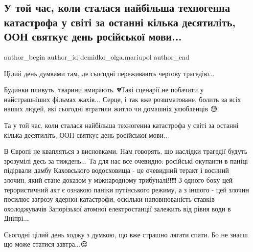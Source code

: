  
 
 
 
 

\subsection{У той час, коли сталася найбільша техногенна катастрофа у світі за останні кілька десятиліть, ООН святкує день російської мови...}
\label{sec:06_06_2023.fb.demidko_olga.mariupol.1.oon_jazyk_zaes}

\ifcmt
 author_begin
   author_id demidko_olga.mariupol
 author_end
\fi

Цілий день думками там, де сьогодні переживають чергову трагедію... 

Будинки пливуть, тварини вмирають. 💔Такі сценарії не побачити у найстрашніших
фільмах жахів... Серце, і так вже розшматоване, болить за всіх наших людей, які
сьогодні втратили житло чи домашніх улюбленців 😓

Та у той час, коли сталася найбільша техногенна катастрофа у світі за останні
кілька десятиліть, ООН святкує день російської мови...

В Європі не квапляться з висновками. Нам говорять, що наслідки трагедії будуть
зрозумілі десь за тиждень... Та для нас все очевидно: російські окупанти в
паніці підірвали дамбу Каховського водосховища - це очевидний теракт і воєнний
злочин, який стане доказом у міжнародному трибуналі!❗️❗️❗️ З одного боку цей
терористичний акт є ознакою паніки путінського режиму, а з іншого - цей злочин
посилює загрозу ядерної катастрофи, оскільки наповнюваність
ставків-охолоджувачів Запорізької атомної електростанції залежить від рівня
води в Дніпрі... 

Сьогодні цілий день ходжу з думкою, що вже страшно лягати спати. Бо не знаєш
що може статися завтра...😔
